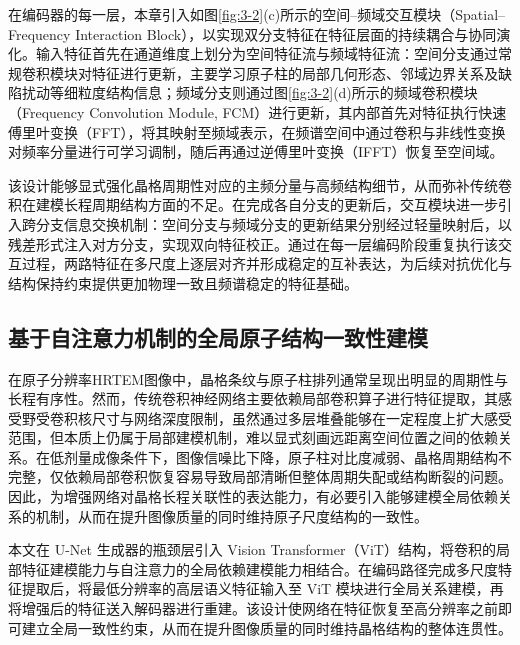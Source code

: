 在编码器的每一层，本章引入如图\ref{fig:3-2}(c)所示的空间–频域交互模块（Spatial–Frequency Interaction Block），以实现双分支特征在特征层面的持续耦合与协同演化。输入特征首先在通道维度上划分为空间特征流与频域特征流：空间分支通过常规卷积模块对特征进行更新，主要学习原子柱的局部几何形态、邻域边界关系及缺陷扰动等细粒度结构信息；频域分支则通过图\ref{fig:3-2}(d)所示的频域卷积模块（Frequency Convolution Module, FCM）进行更新，其内部首先对特征执行快速傅里叶变换（FFT），将其映射至频域表示，在频谱空间中通过卷积与非线性变换对频率分量进行可学习调制，随后再通过逆傅里叶变换（IFFT）恢复至空间域。

该设计能够显式强化晶格周期性对应的主频分量与高频结构细节，从而弥补传统卷积在建模长程周期结构方面的不足。在完成各自分支的更新后，交互模块进一步引入跨分支信息交换机制：空间分支与频域分支的更新结果分别经过轻量映射后，以残差形式注入对方分支，实现双向特征校正。通过在每一层编码阶段重复执行该交互过程，两路特征在多尺度上逐层对齐并形成稳定的互补表达，为后续对抗优化与结构保持约束提供更加物理一致且频谱稳定的特征基础。


\subsection{基于自注意力机制的全局原子结构一致性建模}
在原子分辨率HRTEM图像中，晶格条纹与原子柱排列通常呈现出明显的周期性与长程有序性。然而，传统卷积神经网络主要依赖局部卷积算子进行特征提取，其感受野受卷积核尺寸与网络深度限制，虽然通过多层堆叠能够在一定程度上扩大感受范围，但本质上仍属于局部建模机制，难以显式刻画远距离空间位置之间的依赖关系。在低剂量成像条件下，图像信噪比下降，原子柱对比度减弱、晶格周期结构不完整，仅依赖局部卷积恢复容易导致局部清晰但整体周期失配或结构断裂的问题。因此，为增强网络对晶格长程关联性的表达能力，有必要引入能够建模全局依赖关系的机制，从而在提升图像质量的同时维持原子尺度结构的一致性。

本文在 U-Net 生成器的瓶颈层引入 Vision Transformer（ViT）结构，将卷积的局部特征建模能力与自注意力的全局依赖建模能力相结合。在编码路径完成多尺度特征提取后，将最低分辨率的高层语义特征输入至 ViT 模块进行全局关系建模，再将增强后的特征送入解码器进行重建。该设计使网络在特征恢复至高分辨率之前即可建立全局一致性约束，从而在提升图像质量的同时维持晶格结构的整体连贯性。

